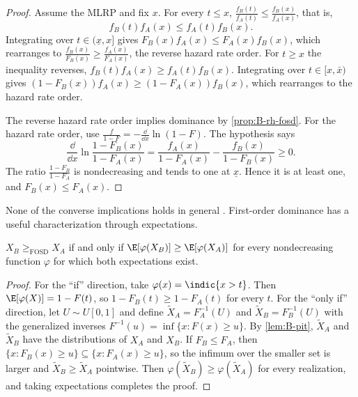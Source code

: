 \begin{proof}
Assume the MLRP and fix $x$. For every $t \leq x$, $\frac{f_B(t)}{f_A(t)} \leq \frac{f_B(x)}{f_A(x)}$, that is,
\[
  f_B(t)f_A(x) \leq f_A(t)f_B(x).
\]
Integrating over $t \in (\underline x, x]$ gives $F_B(x)f_A(x) \leq F_A(x)f_B(x)$, which rearranges to
$\frac{f_B(x)}{F_B(x)} \geq \frac{f_A(x)}{F_A(x)}$, the reverse hazard rate order. For $t \geq x$ the inequality reverses,
$f_B(t)f_A(x) \geq f_A(t)f_B(x)$. Integrating over $t \in [x, \bar x)$ gives
$(1 - F_B(x))f_A(x) \geq (1 - F_A(x))f_B(x)$, which rearranges to the hazard rate order.

The reverse hazard rate order implies dominance by \cref{prop:B-rh-fosd}. For the hazard rate order, use
$\frac{f}{1 - F} = -\frac{\dd}{\dd x}\ln(1 - F)$. The hypothesis says
\[
  \frac{\dd}{\dd x}\ln\frac{1 - F_B(x)}{1 - F_A(x)} = \frac{f_A(x)}{1 - F_A(x)} - \frac{f_B(x)}{1 - F_B(x)} \geq 0.
\]
The ratio $\frac{1 - F_B}{1 - F_A}$ is nondecreasing and tends to one at $\underline x$. Hence it is at least one, and
$F_B(x) \leq F_A(x)$.
\end{proof}

None of the converse implications holds in general \citep{ShakedShanthikumar2007}. First-order dominance has a
useful characterization through expectations.

\begin{proposition}\label{prop:B-fosd-expectations}
$X_B \geq_{\mathrm{FOSD}} X_A$ if and only if $\E[\varphi(X_B)] \geq \E[\varphi(X_A)]$ for every nondecreasing function $\varphi$ for which
both expectations exist.
\end{proposition}

\begin{proof}
For the ``if'' direction, take $\varphi(x) = \indic\{x > t\}$. Then $\E[\varphi(X)] = 1 - F(t)$, so $1 - F_B(t) \geq 1 - F_A(t)$ for
every $t$. For the ``only if'' direction, let $U \sim U[0, 1]$ and define $\tilde X_A = F_A^{-1}(U)$ and $\tilde X_B = F_B^{-1}(U)$
with the generalized inverses $F^{-1}(u) = \inf\{x : F(x) \geq u\}$. By \cref{lem:B-pit}, $\tilde X_A$ and $\tilde X_B$ have the
distributions of $X_A$ and $X_B$. If $F_B \leq F_A$, then $\{x : F_B(x) \geq u\} \subseteq \{x : F_A(x) \geq u\}$, so the infimum over the
smaller set is larger and $\tilde X_B \geq \tilde X_A$ pointwise. Then $\varphi(\tilde X_B) \geq \varphi(\tilde X_A)$ for every realization, and
taking expectations completes the proof.
\end{proof}

